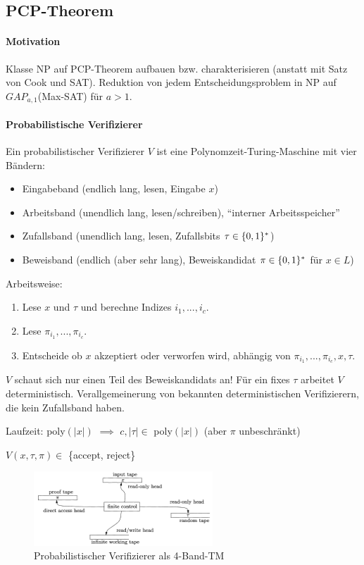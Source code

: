 \subsection{PCP-Theorem}

\paragraph{Motivation}
Klasse NP auf PCP-Theorem aufbauen bzw. charakterisieren (anstatt mit Satz von Cook und SAT).
Reduktion von jedem Entscheidungsproblem in NP auf $GAP_{a,1}$(Max-SAT) für $a>1$.

\paragraph{Probabilistische Verifizierer}
Ein probabilistischer Verifizierer $V$ ist eine Polynomzeit-Turing-Maschine mit vier Bändern:
\begin{itemize}
    \item Eingabeband (endlich lang, lesen, Eingabe $x$)
    \item Arbeitsband (unendlich lang, lesen/schreiben), ``interner Arbeitsspeicher''
    \item Zufallsband (unendlich lang, lesen, Zufallsbits $\tau \in \lbrace 0, 1 \rbrace^*$)
    \item Beweisband (endlich (aber sehr lang), Beweiskandidat $\pi \in \lbrace 0, 1 \rbrace^*$ für $x \in L$)
\end{itemize}

Arbeitsweise:
\begin{enumerate}
    \item Lese $x$ und $\tau$ und berechne Indizes $i_1, ..., i_c$.
    \item Lese $\pi_{i_1}, ..., \pi_{i_c}$.
    \item Entscheide ob $x$ akzeptiert oder verworfen wird, abhängig von $\pi_{i_1}, ..., \pi_{i_c}, x, \tau$.
\end{enumerate}
$V$ schaut sich nur einen Teil des Beweiskandidats an!
Für ein fixes $\tau$ arbeitet $V$ deterministisch.
Verallgemeinerung von bekannten deterministischen Verifizierern, die kein Zufallsband haben.

Laufzeit: poly$(|x|)$ $\implies$ $c, |\tau| \in$ poly$(|x|)$ (aber $\pi$ unbeschränkt)

$V(x, \tau, \pi) \in$ \{accept, reject\}

\begin{figure}[h]
    \centering
    \includegraphics[width=0.6\textwidth]{images/prob-verifier.png}
    \caption{Probabilistischer Verifizierer als 4-Band-TM}
\end{figure}

